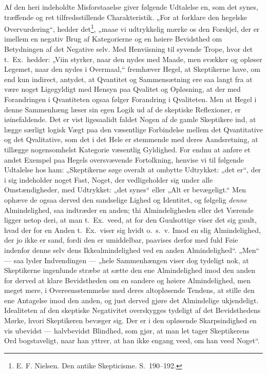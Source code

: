 \documentclass[12pt]{book}
\newcommand{\opage}[1]{\marginnote{\footnotesize\textit{[#1]}}}
\begin{document}
Af den heri indeholdte Misforstaaelse giver følgende Udtalelse en, som det synes, træffende og ret tilfredsstillende Charakteristik. „For at forklare den hegelske Overvurdering“, hedder det\footnote{E. F. Nielsen. Den antike Skepticisme. S.~190--192.}, %
„maae vi udtrykkelig mærke os den Forskjel, der er imellem en negativ Brug af Kategorierne og en høiere Bevidsthed om Betydningen af det Negative selv. Med Henviisning til syvende Trope, hvor det t.\ Ex.\ hedder: „Viin styrker, naar den nydes med Maade, men svækker og opløser Legemet, naar den nydes i Overmaal,“ fremhæver Hegel, at Skeptikerne have, om end kun indirect, antydet, at Qvantitet og Sammensætning ere saa langt fra at være noget Ligegyldigt med Hensyn paa Qvalitet og Opløsning, at der med Forandringen i Qvantiteten ogsaa følger Forandring i Qvaliteten. Men at Hegel i denne Sammenhæng læser sin egen Logik ud af de skeptiske Reflexioner, er iøinefaldende. Det er vist ligesaalidt faldet Nogen af de gamle Skeptikere ind, at lægge særligt logisk Vægt paa den væsentlige Forbindelse mellem det Qvantitative og det Qvalitative, som det i det Hele er stemmende med deres Aandsretning, at tillægge nogensomhelst Kategorie væsentlig Gyldighed. For endnu at anføre et andet Exempel paa Hegels oversvævende Fortolkning, henvise vi til følgende Udtalelse hos ham: „Skeptikerne søge overalt at ombytte Udtrykket: „det er“, der i sig indeholder noget Fast, Noget, der vedligeholder sig under alle Omstændigheder, med Udtrykket: „det synes“ eller „Alt er bevægeligt.“ Men ophæve de ogsaa derved den sandselige Lighed og Identitet, og følgelig \emph{denne}
\opage{219}Almindelighed, saa indtræder en anden; thi Almindeligheden eller det Værende ligger netop deri, at man t.\ Ex.\ veed, at for den Guulsottige viser det sig guult, hvad der for en Anden t.\ Ex.\ viser sig hvidt o.\ s.\ v. Imod en slig Almindelighed, der jo ikke er sand, fordi den er umiddelbar, paavises derfor med fuld Føie indenfor denne selv dens Ikkealmindelighed ved en anden Almindelighed“.%
{} „Men“ --- saa lyder Indvendingen --- „hele Sammenhængen viser dog tydeligt nok, at Skeptikerne ingenlunde stræbe at sætte den ene Almindelighed imod den anden for derved at klare Bevidstheden om en sandere og høiere Almindelighed, men meget mere, i Overeensstemmelse med deres altopløsende Tendens, at stille den ene Antagelse imod den anden, og just derved gjøre det Almindelige ukjendeligt. Idealiteten af den skeptiske Negativitet overskygges tydeligt af det Bevidsthedens Mørke, hvori Skeptikeren bevæger sig. Der er i den opløsende Skarpsindighed en vis ubevidst --- halvbevidst Blindhed, som gjør, at man let tager Skeptikerens Ord bogstaveligt, naar han yttrer, at han ikke engang veed, om han veed Noget“.
\end{document}
